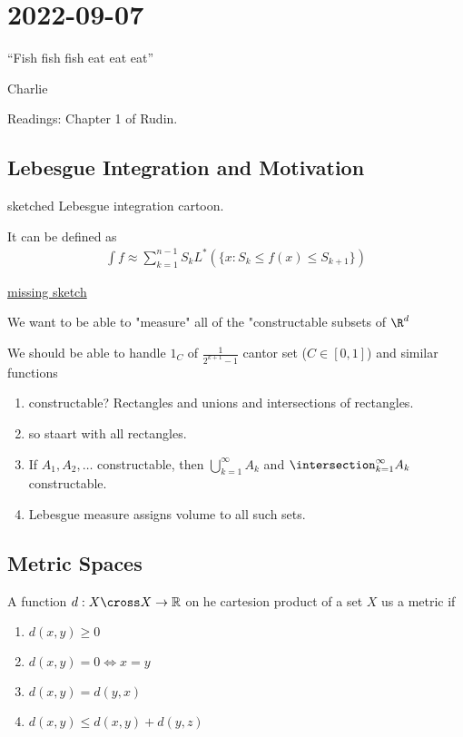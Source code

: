 \section{2022-09-07}

\epigraph{``Fish fish fish eat eat eat''}{Charlie}

Readings: Chapter 1 of Rudin.

\subsection{Lebesgue Integration and Motivation}

sketched Lebesgue integration cartoon.

It can be defined as 
\begin{align*}
	\int f \approx \sum_{k=1}^{n-1} S_k L^* (\{x : S_k \leq f(x) \leq S_{k+1}\})
\end{align*} 

\underline{missing sketch} 

We want to be able to "measure" all of the "constructable subsets of $\R^d$

We should be able to handle $1_C$ of $\frac{1}{2^{k+1} -1 }$ cantor set ($C \in [0,1]$) and similar functions

\begin{enumerate}
	\item constructable? Rectangles and unions and intersections of rectangles.
	\item so staart with all rectangles.
	\item If $A_1, A_2, \ldots$ constructable, then
		$\bigcup_{k=1}^{\infty}A_k$ and $\intersection_{k=1}^{\infty}A_k$ constructable.
	\item Lebesgue measure assigns volume to all such sets.
\end{enumerate}
 
\subsection{Metric Spaces}

A function $d : X \cross X \to \mathbb{R}$ on he cartesion product of a set  $X$ us a metric if

\begin{enumerate}
	\item $d(x,y) \geq 0$
	\item $d(x,y) = 0 \iff x = y$
	\item $d(x,y) = d(y,x)$
	\item $d(x,y) \leq d(x,y) + d(y,z)$
\end{enumerate}

